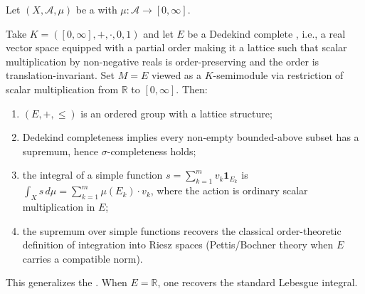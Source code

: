 \begin{definition} \label{definition:riesz_space_vector_valued_integration_as_special_case}
Let $(X,\mathcal{A},\mu)$ be a  with $\mu : \mathcal{A} \to [0,\infty]$.

Take $K = ([0,\infty], +, \cdot, 0, 1)$ and let $E$ be a Dedekind complete , i.e., a real vector space equipped with a partial order making it a lattice such that scalar multiplication by non-negative reals is order-preserving and the order is translation-invariant. Set $M = E$ viewed as a $K$-semimodule via restriction of scalar multiplication from $\mathbb{R}$ to $[0,\infty]$. Then:
\begin{enumerate}
    \item $(E, +, \leq)$ is an ordered group with a lattice structure;
    \item Dedekind completeness implies every non-empty bounded-above subset has a supremum, hence $\sigma$-completeness holds;
    \item the integral of a simple function $s = \sum_{k=1}^m v_k \mathbf{1}_{E_k}$ is $\int_X s\,d\mu = \sum_{k=1}^m \mu(E_k) \cdot v_k$, where the action is ordinary scalar multiplication in $E$;
    \item the supremum over simple functions recovers the classical order-theoretic definition of integration into Riesz spaces (Pettis/Bochner theory when $E$ carries a compatible norm).
\end{enumerate}

This generalizes the . When $E = \mathbb{R}$, one recovers the standard Lebesgue integral.
\end{definition}
